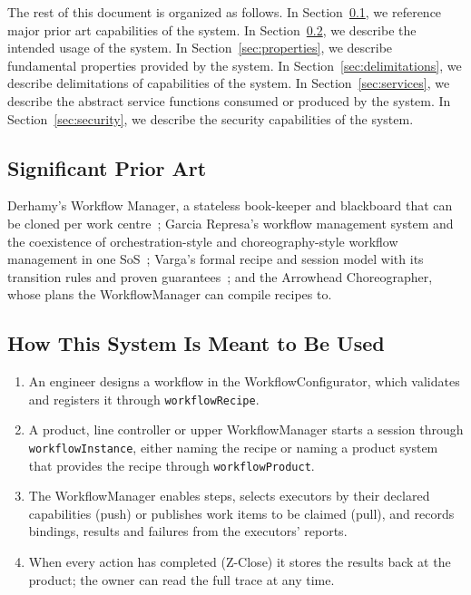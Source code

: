 \documentclass[a4paper]{arrowhead}
\begin{document}
The rest of this document is organized as follows.
In Section~\ref{sec:prior_art}, we reference major prior art capabilities of the system.
In Section~\ref{sec:use}, we describe the intended usage of the system.
In Section~\ref{sec:properties}, we describe fundamental properties provided by the system.
In Section~\ref{sec:delimitations}, we describe delimitations of capabilities of the system.
In Section~\ref{sec:services}, we describe the abstract service functions consumed or produced by the system.
In Section~\ref{sec:security}, we describe the security capabilities of the system.

\newpage
\subsection{Significant Prior Art}
\label{sec:prior_art}
Derhamy's Workflow Manager, a stateless book-keeper and blackboard that can be cloned per work
centre~\cite{derhamy2018,derhamy2018workflow}; Garcia Represa's workflow management system and the coexistence of
orchestration-style and choreography-style workflow management in one SoS~\cite{represa2022}; Varga's formal recipe
and session model with its transition rules and proven guarantees~\cite{varga2026}; and the Arrowhead Choreographer,
whose plans the WorkflowManager can compile recipes to.

\subsection{How This System Is Meant to Be Used}
\label{sec:use}
\begin{enumerate}
\item An engineer designs a workflow in the WorkflowConfigurator, which validates and registers it through
\texttt{workflowRecipe}.
\item A product, line controller or upper WorkflowManager starts a session through \texttt{workflowInstance}, either
naming the recipe or naming a product system that provides the recipe through \texttt{workflowProduct}.
\item The WorkflowManager enables steps, selects executors by their declared capabilities (push) or publishes work
items to be claimed (pull), and records bindings, results and failures from the executors' reports.
\item When every action has completed (Z-Close) it stores the results back at the product; the owner can read the full
trace at any time.
\end{enumerate}
\end{document}
